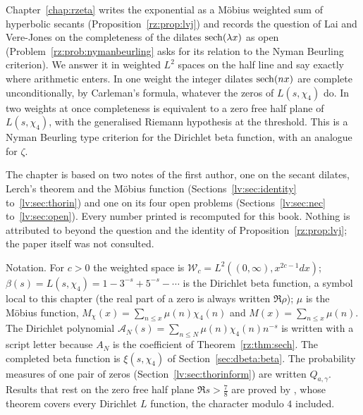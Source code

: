 \label{chap:lv}

Chapter~\ref{chap:rzeta} writes the exponential as a M\"obius weighted sum of hyperbolic secants (Proposition~\ref{rz:prop:lvj}) and records the question of Lai and Vere-Jones \cite{LVJ} on the completeness of the dilates $\operatorname{sech}(\lambda x)$ as open (Problem~\ref{rz:prob:nymanbeurling} asks for its relation to the Nyman Beurling criterion). We answer it in weighted $L^2$ spaces on the half line and say exactly where arithmetic enters. In one weight the integer dilates $\operatorname{sech}(nx)$ are complete unconditionally, by Carleman's formula, whatever the zeros of $L(s,\chi_4)$ do. In two weights at once completeness is equivalent to a zero free half plane of $L(s,\chi_4)$, with the generalised Riemann hypothesis at the threshold. This is a Nyman Beurling type criterion for the Dirichlet beta function, with an analogue for $\zeta$.

The chapter is based on two notes of the first author, one on the secant dilates, Lerch's theorem and the M\"obius function (Sections~\ref{lv:sec:identity} to~\ref{lv:sec:thorin}) and one on its four open problems (Sections~\ref{lv:sec:nec} to~\ref{lv:sec:open}). Every number printed is recomputed for this book. Nothing is attributed to \cite{LVJ} beyond the question and the identity of Proposition~\ref{rz:prop:lvj}; the paper itself was not consulted.

Notation. For $c>0$ the weighted space is $\mathcal W_c=L^2((0,\infty),x^{2c-1}dx)$; $\beta(s)=L(s,\chi_4)=1-3^{-s}+5^{-s}-\cdots$ is the Dirichlet beta function, a symbol local to this chapter (the real part of a zero is always written $\Re\rho$); $\mu$ is the M\"obius function, $M_\chi(x)=\sum_{n\le x}\mu(n)\chi_4(n)$ and $M(x)=\sum_{n\le x}\mu(n)$. The Dirichlet polynomial $\mathcal A_N(s)=\sum_{n\le N}\mu(n)\chi_4(n)n^{-s}$ is written with a script letter because $A_N$ is the coefficient of Theorem~\ref{rz:thm:sech}. The completed beta function is $\xi(s,\chi_4)$ of Section~\ref{sec:dbeta:beta}. The probability measures of one pair of zeros (Section~\ref{lv:sec:thorinform}) are written $Q_{a,\gamma}$. Results that rest on the zero free half plane $\Re s>\frac78$ are proved by \cite{OAI26a}, whose theorem covers every Dirichlet $L$ function, the character modulo $4$ included.

